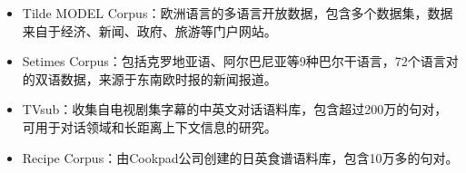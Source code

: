 \begin{appendices}
\begin{itemize}
\vspace{0.5em}
\item Tilde MODEL Corpus：欧洲语言的多语言开放数据，包含多个数据集，数据来自于经济、新闻、政府、旅游等门户网站。
\vspace{0.5em}
\item Setimes Corpus：包括克罗地亚语、阿尔巴尼亚等9种巴尔干语言，72个语言对的双语数据，来源于东南欧时报的新闻报道。
\vspace{0.5em}
\item TVsub：收集自电视剧集字幕的中英文对话语料库，包含超过200万的句对，可用于对话领域和长距离上下文信息的研究。
\vspace{0.5em}
\item Recipe Corpus：由Cookpad公司创建的日英食谱语料库，包含10万多的句对。
\end{itemize}


\end{appendices}


